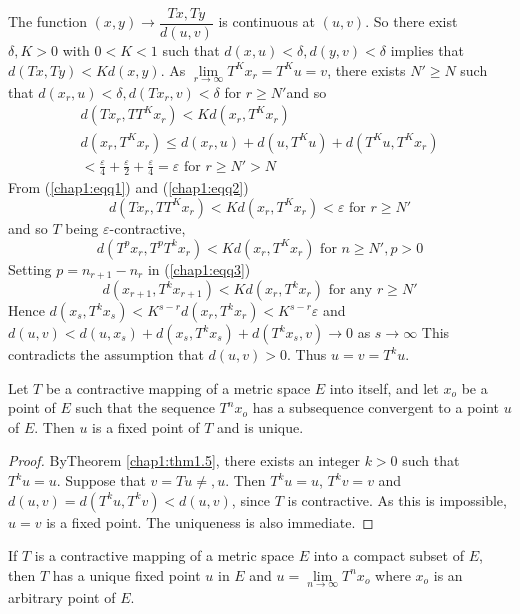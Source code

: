 The function $(x,y) \to \dfrac{Tx, Ty}{d(u,v)}$ is continuous at
$(u,v)$. So there exist $\delta, K> 0$ with $0 < K < 1$ such that
$d(x, u)< \delta, d(y,v) < \delta$ implies that $d (Tx, Ty) < K
d(x,y)$. As $\lim\limits_{r \to \infty} T^K x_r = T^K u = v$, there
exists $N' \geq N$ such that $d (x_r, u) < \delta , d (T x_r , v)<
\delta$ for $r \geq N'$\pageoriginale and so 
\begin{gather*}
  d(Tx_r, T T^K x_r) < K d (x_r, T^K x_r) \tag{1}\label{chap1:eqq1}\\
  d (x_r, T^K x_r) \leq d(x_r, u) + d(u, T^K u) + d(T^K u, T^K x_r)\\
  <\frac{\varepsilon}{4} + \frac{\varepsilon}{2}+
  \frac{\varepsilon}{4} = \varepsilon \text{ for } r\geq 
  N' > N \tag{2}\label{chap1:eqq2} 
\end{gather*}
From (\ref{chap1:eqq1}) and (\ref{chap1:eqq2})
$$
d(Tx_r , T T^K x_r) < K d(x_r , T^K x_r)< \varepsilon \text{ for } r \geq N'
$$
and so $T$ being $\varepsilon$-contractive,
\begin{equation*}
  d(T^p x_r, T^p T^k x_r) < K d(x_r , T^K x_r) \text{ for } n \geq N' ,
  p> 0 \tag{3}\label{chap1:eqq3} 
\end{equation*}
Setting $p = n_{r+1} - n_r $ in (\ref{chap1:eqq3})
$$
d(x_{r+1}, T^k x_{r+1}) < Kd(x_r , T^k x_r) \text{ for any } r \geq N' 
$$
Hence $d (x_s, T^k x_s) < K^{s-r} d(x_r , T^k x_r) < K^{s-r}
\varepsilon$ and $d(u,v) < d (u,x_s)+ d(x_s, T^k x_s) +d (T^k x_s , v)
\to 0$ as $s \to \infty$ This contradicts the assumption that $d(u,v)
> 0$. Thus $u = v=T^k u$. 

\begin{thmm}[Edelstein ]%
  Let $T$ be a contractive mapping of a metric space $E$ into itself,
  and let $x_o$ be a point of $E$ such that the sequence $T^n x_o$ has
  a subsequence convergent to a point $u$ of $E$. Then $u$ is a fixed
  point of $T$ and is unique. 
\end{thmm}

\begin{proof}
  By\pageoriginale Theorem \ref{chap1:thm1.5}, there exists an integer
  $k > 0$ such that $T^k u = 
  u$. Suppose that $v = Tu \neq, u$. Then $T^k u = u$, $T^k v=v$ and
  $d(u,v) = d(T^k u, T^k v) < d(u,v)$, since $T$ is contractive. As
  this is impossible, $u=v$ is a fixed point. The uniqueness is also
  immediate. 
\end{proof}

\begin{coro*}%
  If $T$ is a contractive mapping of a metric space $E$ into a compact
  subset of $E$, then $T$ has a unique fixed point $u$ in $E$ and $u = 
  \lim\limits_{n \to \infty} T^n x_o$ where $x_o$ is an arbitrary
  point of $E$. 
\end{coro*}
